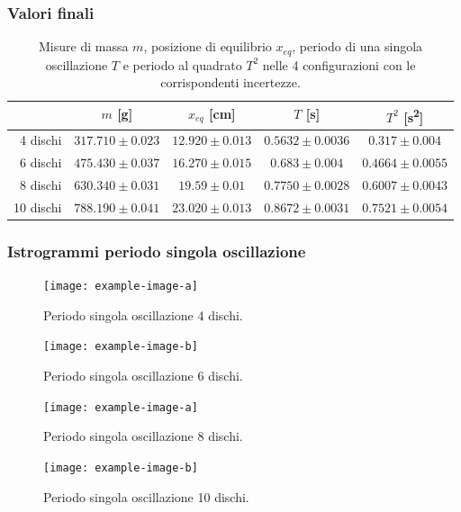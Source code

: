 \documentclass[titlepage]{article}
\numberwithin{equation}{section}
\numberwithin{figure}{section}
\numberwithin{table}{section}
\begin{document}
\subsubsection{Valori finali}

\begin{table}[ht]
  \centering
  \begin{tabular}{rcccc}
    \toprule
    & $m$ [\si{\gram}] & $x_{eq}$ [\si{\centi\metre}] & $T$ [\si{\second}] & $T^2$ [\si{\second\squared}] \\
    \midrule
    4 dischi  & $317.710 \pm 0.023$ & $12.920 \pm 0.013$ & $0.5632 \pm 0.0036$ & $0.317  \pm  0.004$ \\
    6 dischi  & $475.430 \pm 0.037$ & $16.270 \pm 0.015$ & $0.683  \pm  0.004$ & $0.4664 \pm 0.0055$ \\
    8 dischi  & $630.340 \pm 0.031$ & $19.59  \pm  0.01$ & $0.7750 \pm 0.0028$ & $0.6007 \pm 0.0043$ \\
    10 dischi & $788.190 \pm 0.041$ & $23.020 \pm 0.013$ & $0.8672 \pm 0.0031$ & $0.7521 \pm 0.0054$ \\
    \bottomrule
  \end{tabular}
  \caption{Misure di massa $m$, posizione di equilibrio $x_{eq}$, periodo di una singola oscillazione $T$ e periodo al quadrato $T^2$ nelle 4 configurazioni con le corrispondenti incertezze.}
\end{table}

\pagebreak
\subsubsection{Istrogrammi periodo singola oscillazione}

\begin{figure}[ht]
  \centering
  \begin{minipage}{0.5 \textwidth}
    \texttt{[image: example-image-a]}
    \caption{Periodo singola oscillazione 4 dischi.}
  \end{minipage}%
  \begin{minipage}{0.5 \textwidth}
    \texttt{[image: example-image-b]}
    \caption{Periodo singola oscillazione 6 dischi.}
  \end{minipage}
\end{figure}

\begin{figure}[ht]
  \centering
  \begin{minipage}{0.5 \textwidth}
    \texttt{[image: example-image-a]}
    \caption{Periodo singola oscillazione 8 dischi.}
  \end{minipage}%
  \begin{minipage}{0.5 \textwidth}
    \texttt{[image: example-image-b]}
    \caption{Periodo singola oscillazione 10 dischi.}
  \end{minipage}
\end{figure}
\end{document}
